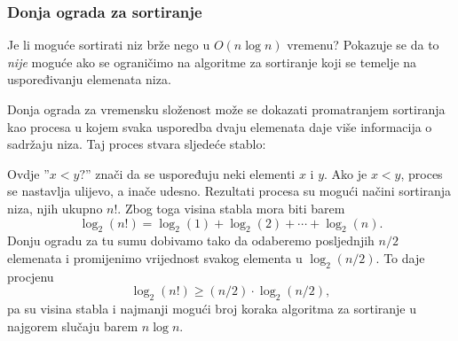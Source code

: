 \subsubsection{Donja ograda za sortiranje}

Je li moguće sortirati niz brže
nego u $O(n \log n)$ vremenu?
Pokazuje se da to \emph{nije} moguće
ako se ograničimo na algoritme za sortiranje
koji se temelje na uspoređivanju elemenata niza.

Donja ograda za vremensku složenost
može se dokazati promatranjem sortiranja
kao procesa u kojem svaka usporedba dvaju elemenata
daje više informacija o sadržaju niza.
Taj proces stvara sljedeće stablo:

\begin{center}
\end{center}

Ovdje ''$x<y?$'' znači da se uspoređuju
neki elementi $x$ i $y$.
Ako je $x<y$, proces se nastavlja ulijevo,
a inače udesno.
Rezultati procesa su mogući
načini sortiranja niza, njih ukupno $n!$.
Zbog toga visina stabla
mora biti barem
\[ \log_2(n!) = \log_2(1)+\log_2(2)+\cdots+\log_2(n).\]
Donju ogradu za tu sumu dobivamo
tako da odaberemo posljednjih $n/2$ elemenata i
promijenimo vrijednost svakog elementa u $\log_2(n/2)$.
To daje procjenu
\[ \log_2(n!) \ge (n/2) \cdot \log_2(n/2),\]
pa su visina stabla i najmanji
mogući broj koraka algoritma za
sortiranje u najgorem slučaju
barem $n \log n$.

